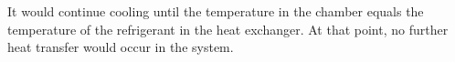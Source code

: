 It would continue cooling until the temperature in the chamber equals the temperature of the refrigerant in the heat exchanger. At that point, no further heat transfer would occur in the system.